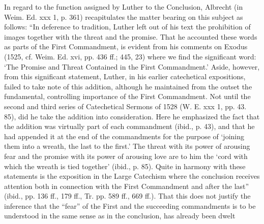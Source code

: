 In regard to the function assigned by Luther to the Conclusion, Albrecht (in Weim. Ed. xxx 1, p. 361) recapitulates the matter bearing on this subject as follows: “In deference to tradition, Luther left out of his text the prohibition of images together with the threat and the promise. That he accounted these words as parts of the First Commandment, is evident from his comments on Exodus (1525, cf. Weim. Ed. xvi, pp. 436 ff.; 445, 23) where we find the significant word: ‘The Promise and Threat Contained in the First Commandment.’ Aside, however, from this significant statement, Luther, in his earlier catechetical expositions, failed to take note of this addition, although he maintained from the outset the fundamental, controlling importance of the First Commandment. Not until the second and third series of Catechetical Sermons of 1528 (W. E. xxx 1, pp. 43. 85), did he take the addition into consideration. Here he emphasized the fact that the addition was virtually part of each commandment (ibid., p. 43), and that he had appended it at the end of the commandments for the purpose of ‘joining them into a wreath, the last to the first.’ The threat with its power of arousing fear and the promise with its power of arousing love are to him the ‘cord with which the wreath is tied together’ (ibid., p. 85). Quite in harmony with these statements is the exposition in the Large Catechism where the conclusion receives attention both in connection with the First Commandment and after the last” (ibid., pp. 136 ff., 179 ff., Tr. pp. 589 ff., 669 ff.). That this does not justify the inference that the “fear” of the First and the succeeding commandments is to be understood in the same sense as in the conclusion, has already been dwelt
